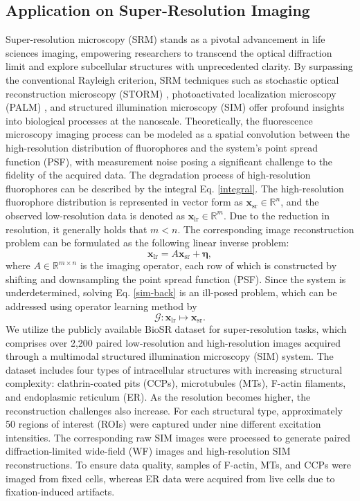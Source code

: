 \documentclass[preprint,numbers,sort&compress]{elsarticle}
\begin{document}
			\subsection{Application on Super-Resolution Imaging}  \label{exp:sr}
			Super-resolution microscopy (SRM) stands as a pivotal advancement in life sciences imaging, empowering researchers to transcend the optical diffraction limit and explore subcellular structures with unprecedented clarity. By surpassing the conventional Rayleigh criterion, SRM techniques such as stochastic optical reconstruction microscopy (STORM) \cite{rust2006sub}, photoactivated localization microscopy (PALM) \cite{betzig2006imaging}, and structured illumination microscopy (SIM) \cite{li2015extended} offer profound insights into biological processes at the nanoscale. Theoretically, the fluorescence microscopy imaging process can be modeled as a spatial convolution between the high-resolution distribution of fluorophores and the system’s point spread function (PSF), with measurement noise posing a significant challenge to the fidelity of the acquired data.  
			The degradation process of high-resolution fluorophores can be described by the integral Eq. \eqref{integral}.  
			The high-resolution fluorophore distribution is represented in vector form as \(\mathbf{x}_{\mathrm{sr}} \in \mathbb{R}^n\), and the observed low-resolution data is denoted as \(\mathbf{x}_{\mathrm{lr}} \in \mathbb{R}^m\). Due to the reduction in resolution, it generally holds that \(m < n\). The corresponding image reconstruction problem can be formulated as the following linear inverse problem:
			\begin{equation}\label{sim-back}
				\mathbf{x}_{\mathrm{lr}} = A \mathbf{x}_{\mathrm{sr}} + \boldsymbol{\eta},
			\end{equation}
			where \(A \in \mathbb{R}^{m \times n}\) is the imaging operator, each row of which is constructed by shifting and downsampling the point spread function (PSF). Since the system is underdetermined, solving Eq. \eqref{sim-back} is an ill-posed problem, which can be addressed using operator learning method by
			\begin{equation*}
				\mathcal{G}: \mathbf{x}_{\mathrm{lr}} \mapsto \mathbf{x}_{\mathrm{sr}}.
			\end{equation*}
			We utilize the publicly available BioSR dataset \cite{qiao2021evaluation} for super-resolution tasks, which comprises over 2,200 paired low-resolution and high-resolution images acquired through a multimodal structured illumination microscopy (SIM) system. The dataset includes four types of intracellular structures with increasing structural complexity: clathrin-coated pits (CCPs), microtubules (MTs), F-actin filaments, and endoplasmic reticulum (ER). As the resolution becomes higher, the reconstruction challenges also increase. For each structural type, approximately 50 regions of interest (ROIs) were captured under nine different excitation intensities. The corresponding raw SIM images were processed to generate paired diffraction-limited wide-field (WF) images and high-resolution SIM reconstructions. To ensure data quality, samples of F-actin, MTs, and CCPs were imaged from fixed cells, whereas ER data were acquired from live cells due to fixation-induced artifacts.
			
\end{document}
